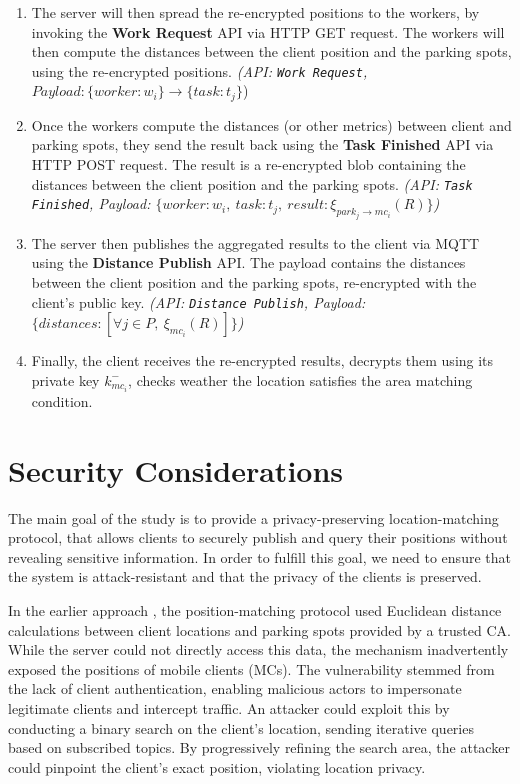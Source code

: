 \begin{enumerate}
    \item The server will then spread the re-encrypted positions to the workers, by invoking the \textbf{Work Request} API via HTTP GET request. The workers will then compute the distances between the client position and the parking spots, using the re-encrypted positions. \emph{(API: \texttt{Work Request}, $Payload: \{ worker: w_i \} \to \{task: t_j \} $})
    \item Once the workers compute the distances (or other metrics) between client and parking spots, they send the result back using the \textbf{Task Finished} API via HTTP POST request. The result is a re-encrypted blob containing the distances between the client position and the parking spots. \emph{(API: \texttt{Task Finished}, Payload: $\{worker: w_i,\ task: t_j,\ result: \xi_{park_j \to mc_i}(R)\}$)}
    \item The server then publishes the aggregated results to the client via MQTT using the \textbf{Distance Publish} API. The payload contains the distances between the client position and the parking spots, re-encrypted with the client's public key. \emph{(API: \texttt{Distance Publish}, Payload: $\{distances: [\forall j \in P,\ \xi_{mc_i}(R)]\}$)}
    \item Finally, the client receives the re-encrypted results, decrypts them using its private key $k_{mc_i}^-$, checks weather the location satisfies the area matching condition.
\end{enumerate}

\section{Security Considerations}

The main goal of the study is to provide a privacy-preserving location-matching protocol, that allows clients to securely publish and query their positions without revealing sensitive information. In order to fulfill this goal, we need to ensure that the system is attack-resistant and that the privacy of the clients is preserved.

In the earlier approach \cite{genova2024helamqtt}, the position-matching protocol used Euclidean distance calculations between client locations and parking spots provided by a trusted CA. While the server could not directly access this data, the mechanism inadvertently exposed the positions of mobile clients (MCs). The vulnerability stemmed from the lack of client authentication, enabling malicious actors to impersonate legitimate clients and intercept traffic. An attacker could exploit this by conducting a binary search on the client’s location, sending iterative queries based on subscribed topics. By progressively refining the search area, the attacker could pinpoint the client’s exact position, violating location privacy.

